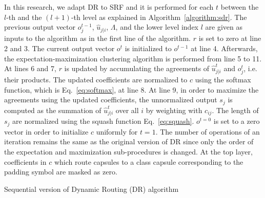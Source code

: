 \documentclass[review]{elsarticle}
\begin{document}
In this research, we adapt DR to SRF and it is performed for each $t$ between the $l$-th and the $(l+1)$-th level as explained in Algorithm~\ref{algorithm:sdr}.
The previous output vector $o_j^{t-1}$, $\hat{u}_{j|i}$, $\Lambda$, and the lower level index $l$ are given as inputs to the algorithm as in the first line of the algorithm.
$r$ is set to zero at line 2 and 3.
The current output vector $o^t$ is initialized to $o^{t-1}$ at line 4.
Afterwards, the expectation-maximization clustering algorithm is performed from line 5 to 11.
At lines 6 and 7, $r$ is updated by accumulating the agreements of $\hat{u}_{j|i}^t$ and $o_j^{t}$, i.e. their products.
The updated coefficients are normalized to $c$ using the softmax function, which is Eq.~\ref{eq:softmax}, at line 8.
At line 9, in order to maximize the agreements using the updated coefficients, the unnormalized output $s_j$ is computed as the summation of $\hat{u}^t_{j|i}$ over all $i$ by weighting with $c_{ij}$.
The length of $s_j$ are normalized using the squash function Eq.~\ref{eq:squash}.
$o^{t=0}$ is set to a zero vector in order to initialize $c$ uniformly for $t=1$.
The number of operations of an iteration remains the same as the original version of DR since only the order of the expectation and maximization sub-procedures is changed.
At the top layer, coefficients in $c$ which route capsules to a class capsule corresponding to the padding symbol are masked as zero.

\begin{algorithm}[H]
\caption{Sequential version of Dynamic Routing (DR) algorithm}\label{euclid}
\label{algorithm:sdr}
\end{algorithm}
\end{document}
